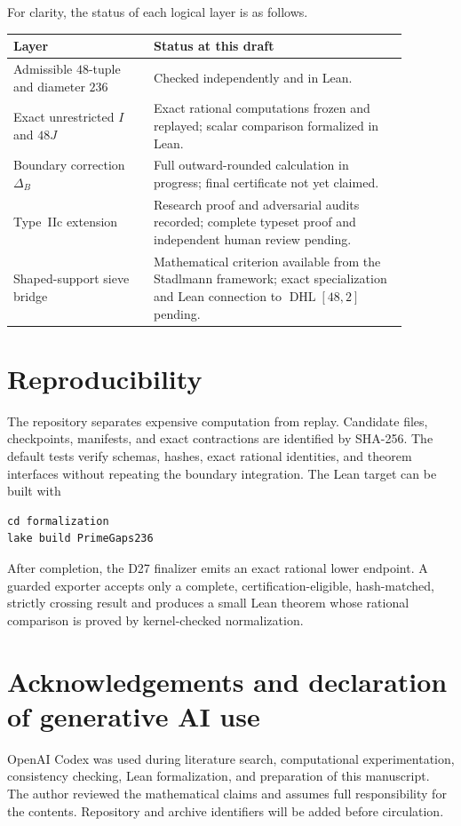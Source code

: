 \documentclass[11pt]{amsart}
\theoremstyle{definition}
\newcommand{\DHL}{\operatorname{DHL}}
\begin{document}
For clarity, the status of each logical layer is as follows.
\begin{center}
\begin{tabular}{@{}p{0.31\linewidth}p{0.57\linewidth}@{}}
\toprule
Layer & Status at this draft \\
\midrule
Admissible $48$-tuple and diameter $236$ & Checked independently and in Lean.\\
Exact unrestricted $I$ and $48J$ & Exact rational computations frozen and
replayed; scalar comparison formalized in Lean.\\
Boundary correction $\Delta_B$ & Full outward-rounded calculation in progress;
final certificate not yet claimed.\\
Type~IIc extension & Research proof and adversarial audits recorded; complete
typeset proof and independent human review pending.\\
Shaped-support sieve bridge & Mathematical criterion available from the
Stadlmann framework; exact specialization and Lean connection to $\DHL[48,2]$
pending.\\
\bottomrule
\end{tabular}
\end{center}

\section{Reproducibility}

The repository separates expensive computation from replay.  Candidate files,
checkpoints, manifests, and exact contractions are identified by SHA-256.  The
default tests verify schemas, hashes, exact rational identities, and theorem
interfaces without repeating the boundary integration.  The Lean target can be
built with
\begin{verbatim}
cd formalization
lake build PrimeGaps236
\end{verbatim}
After completion, the D27 finalizer emits an exact rational lower endpoint.  A
guarded exporter accepts only a complete, certification-eligible, hash-matched,
strictly crossing result and produces a small Lean theorem whose rational
comparison is proved by kernel-checked normalization.

\section*{Acknowledgements and declaration of generative AI use}

OpenAI Codex was used during literature search, computational experimentation,
consistency checking, Lean formalization, and preparation of this manuscript.
The author reviewed the mathematical claims and assumes full responsibility for
the contents.  Repository and archive identifiers will be added before
circulation.



\end{document}
